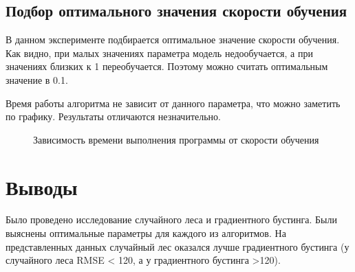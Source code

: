 \documentclass[oneside,final,12pt]{article}
\begin{document}
\subsection {Подбор оптимального значения скорости обучения}
	В данном эксперименте подбирается оптимальное значение скорости обучения. Как видно, при малых значениях параметра модель недообучается, а при значениях близких к 1 переобучается. Поэтому можно считать оптимальным значение в 0.1.

	Время работы алгоритма не зависит от данного параметра, что можно заметить по графику. Результаты отличаются незначительно.

\begin{figure}[h!]
\caption{Зависимость времени выполнения программы от скорости обучения}
\label{fig:image8}
\end{figure}

\section {Выводы}
Было проведено исследование случайного леса и градиентного бустинга. Были выяснены оптимальные параметры для каждого из алгоритмов. На представленных данных случайный лес оказался лучше градиентного бустинга (у случайного леса RMSE < 120, а у градиентного бустинга >120). 
\end{document}
